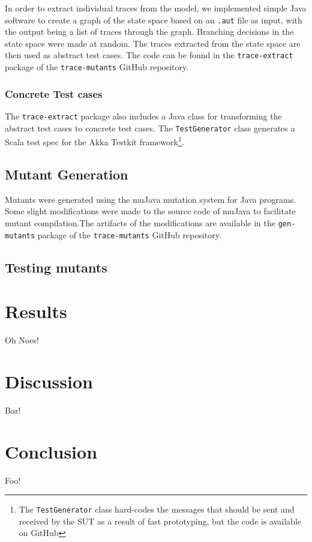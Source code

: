 \documentclass{article}
\begin{document}
	In order to extract individual traces from the \Rebeca model, we implemented simple Java software to create a graph of the state space based on an \texttt{.aut} file as input, with the output being a list of traces through the graph. Branching decisions in the state space were made at random. The traces extracted from the state space are then used as abstract test cases.
	The code can be found in the \texttt{trace-extract} package of the \texttt{trace-mutants} GitHub repository. \nocite{trace-mutants}


	\subsubsection{Concrete Test cases}
	The \texttt{trace-extract} package also includes a Java class for transforming the abstract test cases to concrete test cases. The \texttt{TestGenerator} class generates a Scala test spec for the Akka Testkit framework\footnote{The \texttt{TestGenerator} class hard-codes the messages that should be sent and received by the SUT as a result of fast prototyping, but the code is available on GitHub}. 

	\subsection{Mutant Generation}
	Mutants were generated using the muJava \citet{mujava} mutation system for Java programs. Some slight modifications were made to the source code of muJava to facilitate mutant compilation.The artifacts of the modifications are available in the \texttt{gen-mutants} package of the \texttt{trace-mutants} GitHub repository.

	\subsection{Testing mutants}
	\label{ref:method_testing}
		

\section{Results}
	Oh Noes!

\section{Discussion}
	Bar!

\section{Conclusion}
	Foo!


\end{document}
